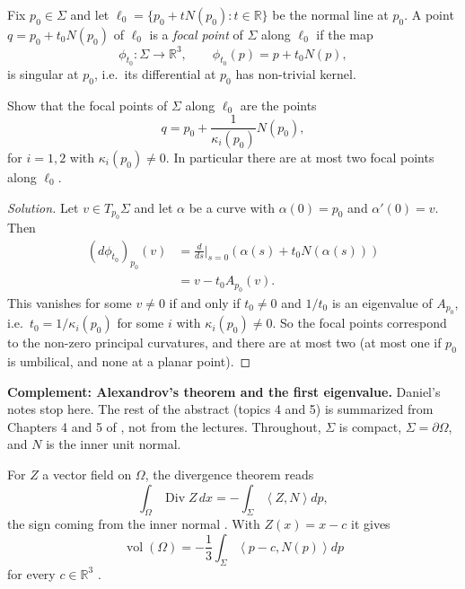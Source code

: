 \begin{definition}
\label{definition-alias-focal-point}
Fix $p_0\in\Sigma$ and let
$\ell_0=\{p_0+tN(p_0):t\in\mathbb{R}\}$ be
the normal line at $p_0$. A point
$q=p_0+t_0N(p_0)$ of $\ell_0$ is a
\emph{focal point} of $\Sigma$ along
$\ell_0$ if the map
$$
\phi_{t_0}:\Sigma\to\mathbb{R}^3,
\qquad
\phi_{t_0}(p)=p+t_0N(p),
$$
is singular at $p_0$, i.e.\ its
differential at $p_0$ has non-trivial
kernel.
\end{definition}

\begin{exercise}
\label{exercise-alias-focal-points}
Show that the focal points of $\Sigma$
along $\ell_0$ are the points
$$
q=p_0+\frac{1}{\kappa_i(p_0)}N(p_0),
$$
for $i=1,2$ with $\kappa_i(p_0)\neq 0$. In
particular there are at most two focal
points along $\ell_0$.
\end{exercise}

\begin{proof}[Solution]
Let $v\in T_{p_0}\Sigma$ and let $\alpha$
be a curve with $\alpha(0)=p_0$ and
$\alpha'(0)=v$. Then
$$
\begin{aligned}
(d\phi_{t_0})_{p_0}(v)
&=\frac{d}{ds}\Big|_{s=0}
\left(\alpha(s)+t_0N(\alpha(s))\right)\\
&=v-t_0A_{p_0}(v).
\end{aligned}
$$
This vanishes for some $v\neq 0$ if and
only if $t_0\neq 0$ and $1/t_0$ is an
eigenvalue of $A_{p_0}$, i.e.\
$t_0=1/\kappa_i(p_0)$ for some $i$ with
$\kappa_i(p_0)\neq 0$. So the focal points
correspond to the non-zero principal
curvatures, and there are at most two
(at most one if $p_0$ is umbilical, and
none at a planar point).
\end{proof}

\medskip\noindent
{\bf Complement: Alexandrov's theorem and
the first eigenvalue.}
Daniel's notes stop here. The rest of the
abstract (topics 4 and 5) is summarized
from Chapters 4 and 5 of
\cite{alias2006analisis}, not from the
lectures. Throughout, $\Sigma$ is compact,
$\Sigma=\partial\Omega$, and $N$ is the
inner unit normal.

For $Z$ a vector field on $\Omega$, the
divergence theorem reads
$$
\int_\Omega\operatorname{Div}Z\,dx
=-\int_\Sigma\left\langle{} Z,N
\right\rangle{}dp,
$$
the sign coming from the inner normal
\cite[Theorem 4.2, p.~33]{alias2006analisis}.
With $Z(x)=x-c$ it gives
\begin{equation}
\label{equation-alias-volume}
\operatorname{vol}(\Omega)
=-\frac{1}{3}\int_\Sigma\left\langle{}
p-c,N(p)\right\rangle{}dp
\end{equation}
for every $c\in\mathbb{R}^3$
\cite[Lemma 4.3, p.~33]{alias2006analisis}.

